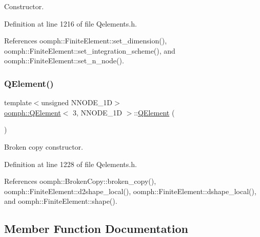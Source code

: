 Constructor. 



Definition at line 1216 of file Qelements.\+h.



References oomph\+::\+Finite\+Element\+::set\+\_\+dimension(), oomph\+::\+Finite\+Element\+::set\+\_\+integration\+\_\+scheme(), and oomph\+::\+Finite\+Element\+::set\+\_\+n\+\_\+node().

\mbox{\label{classoomph_1_1QElement_3_013_00_01NNODE__1D_01_4_a960c5fd835088e5e45cdc9abdfa04222}} 
\subsubsection{\texorpdfstring{Q\+Element()}{QElement()}\hspace{0.1cm}{\footnotesize\ttfamily [2/2]}}
{\footnotesize\ttfamily template$<$unsigned N\+N\+O\+D\+E\+\_\+1D$>$ \\
\hyperlink{classoomph_1_1QElement}{oomph\+::\+Q\+Element}$<$ 3, N\+N\+O\+D\+E\+\_\+1D $>$\+::\hyperlink{classoomph_1_1QElement}{Q\+Element} (\begin{DoxyParamCaption}\item[{const \hyperlink{classoomph_1_1QElement}{Q\+Element}$<$ 3, N\+N\+O\+D\+E\+\_\+1D $>$ \&}]{ }\end{DoxyParamCaption})\hspace{0.3cm}{\ttfamily [inline]}}



Broken copy constructor. 



Definition at line 1228 of file Qelements.\+h.



References oomph\+::\+Broken\+Copy\+::broken\+\_\+copy(), oomph\+::\+Finite\+Element\+::d2shape\+\_\+local(), oomph\+::\+Finite\+Element\+::dshape\+\_\+local(), and oomph\+::\+Finite\+Element\+::shape().



\subsection{Member Function Documentation}
\mbox{\label{classoomph_1_1QElement_3_013_00_01NNODE__1D_01_4_a2d0db26e0413a1df4885af59cbf57efd}} 
